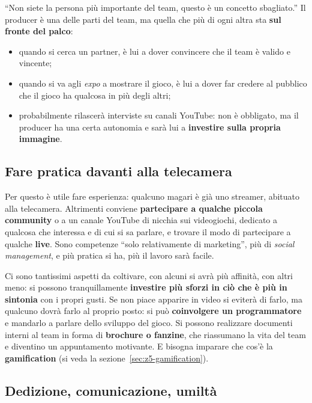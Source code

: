 ``Non siete la persona più importante del team, questo è un concetto
sbagliato.'' Il producer è una delle parti del team, ma quella che più di ogni
altra sta \textbf{sul fronte del palco}:
\begin{itemize}
  \item quando si cerca un partner, è lui a dover convincere che il team è
        valido e vincente;
  \item quando si va agli \emph{expo} a mostrare il gioco, è lui a dover far
        credere al pubblico che il gioco ha qualcosa in più degli altri;
  \item probabilmente rilascerà interviste su canali YouTube: non è obbligato,
        ma il producer ha una certa autonomia e sarà lui a \textbf{investire
        sulla propria immagine}.
\end{itemize}

\subsection{Fare pratica davanti alla telecamera}

Per questo è utile fare esperienza: qualcuno magari è già uno streamer, abituato
alla telecamera. Altrimenti conviene \textbf{partecipare a qualche piccola
community} o a un canale YouTube di nicchia sui videogiochi, dedicato a qualcosa
che interessa e di cui si sa parlare, e trovare il modo di partecipare a qualche
\textbf{live}. Sono competenze ``solo relativamente di marketing'', più di
\emph{social management}, e più pratica si ha, più il lavoro sarà facile.

Ci sono tantissimi aspetti da coltivare, con alcuni si avrà più affinità, con
altri meno: si possono tranquillamente \textbf{investire più sforzi in ciò che è
più in sintonia} con i propri gusti. Se non piace apparire in video si eviterà
di farlo, ma qualcuno dovrà farlo al proprio posto: si può
\textbf{coinvolgere un programmatore} e mandarlo a parlare dello sviluppo del
gioco. Si possono realizzare documenti interni al team in forma di
\textbf{brochure o fanzine}, che riassumano la vita del team e diventino un
appuntamento motivante. E bisogna imparare che cos'è la \textbf{gamification}
(si veda la sezione~\ref{sec:z5-gamification}).

\subsection{Dedizione, comunicazione, umiltà}

